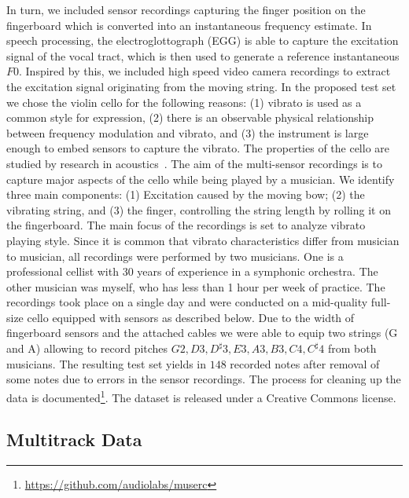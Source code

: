 In turn, we included sensor recordings capturing the finger position on the fingerboard which is converted into an instantaneous frequency estimate. 
In speech processing, the electroglottograph (EGG) is able to capture the excitation signal of the vocal tract, which is then used to generate a reference instantaneous $F0$.
Inspired by this, we included high speed video camera recordings to extract the excitation signal originating from the moving string.
In the proposed test set we chose the violin cello for the following reasons: (1) vibrato is used as a common style for expression, (2) there is an observable physical relationship between frequency modulation and vibrato, and (3) the instrument is large enough to embed sensors to capture the vibrato. The properties of the cello are studied by research in acoustics~\cite{woodhouse04, woodhouse99}.
The aim of the multi-sensor recordings is to capture major aspects of the cello while being played by a musician. We identify three main components: (1) Excitation caused by the moving bow; (2) the vibrating string, and (3) the finger, controlling the string length by rolling it on the fingerboard.
The main focus of the recordings is set to analyze vibrato playing style. Since it is common that vibrato characteristics differ from musician to musician, all recordings were performed by two musicians. One is a professional cellist with 30 years of experience in a symphonic orchestra. 
The other musician was myself, who has less than 1 hour per week of practice.
The recordings took place on a single day and were conducted on a mid-quality full-size cello equipped with sensors as described below. Due to the width of fingerboard sensors and the attached cables we were able to equip two strings (G and A) allowing to record pitches ${G2, D3, D^\sharp3, E3, A3, B3, C4, C^\sharp4}$ from both musicians. The resulting test set yields in $148$ recorded notes after removal of some notes due to errors in the sensor recordings. The process for cleaning up the data is documented\footnote{\url{https://github.com/audiolabs/muserc}}. The dataset is released under a Creative Commons license.

\subsection{Multitrack Data}

